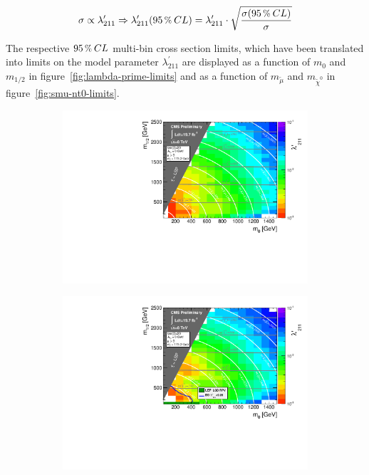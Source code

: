 \begin{equation}
  \label{eq:xs-lambda-scale}
  \sigma \propto \lambda^\prime_{211} \Rightarrow \lambda^\prime_{211} (95\,\pct\: CL) = \lambda^\prime_{211} \cdot \sqrt{ \frac{\sigma (95\,\pct\: CL)}{\sigma} } 
\end{equation}

The respective $95\,\pct\: CL$ multi-bin cross section limits, which have been translated into limits on the model parameter $\lambda^{\prime}_{211}$ are displayed as a function of $m_0$ and $m_{1/2}$ in figure~\ref{fig:lambda-prime-limits} and as a function of $m_{\tilde{\mu}}$ and $m_{\tilde{\chi}^0}$ in figure~\ref{fig:smu-nt0-limits}.

\begin{figure}[!htbp]
  \centering
  \begin{subfigure}[b]{0.85\textwidth}
    \centering
    \includegraphics[width=\textwidth]{plots/l211limits_MultiBin_expected_logz-colz.pdf}
    \caption{\label{fig:lambda-prime-exp}}
  \end{subfigure}
  \begin{subfigure}[b]{0.85\textwidth}
    \centering
    \includegraphics[width=\textwidth]{plots/l211limits_MultiBin_logz-colz.pdf}

\end{subfigure}
\end{figure}
